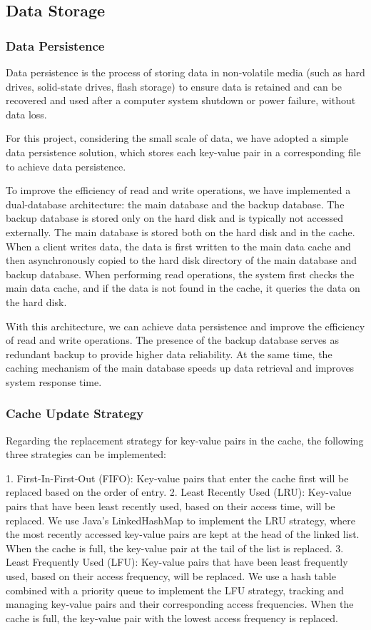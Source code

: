 \documentclass[sigconf]{acmart}
\begin{document}
\subsection{Data Storage}

\subsubsection{Data Persistence}

Data persistence is the process of storing data in non-volatile media (such as hard drives, solid-state drives, flash storage) to ensure data is retained and can be recovered and used after a computer system shutdown or power failure, without data loss.

For this project, considering the small scale of data, we have adopted a simple data persistence solution, which stores each key-value pair in a corresponding file to achieve data persistence.

To improve the efficiency of read and write operations, we have implemented a dual-database architecture: the main database and the backup database. The backup database is stored only on the hard disk and is typically not accessed externally. The main database is stored both on the hard disk and in the cache. When a client writes data, the data is first written to the main data cache and then asynchronously copied to the hard disk directory of the main database and backup database. When performing read operations, the system first checks the main data cache, and if the data is not found in the cache, it queries the data on the hard disk.

With this architecture, we can achieve data persistence and improve the efficiency of read and write operations. The presence of the backup database serves as redundant backup to provide higher data reliability. At the same time, the caching mechanism of the main database speeds up data retrieval and improves system response time.

\subsubsection{Cache Update Strategy}

Regarding the replacement strategy for key-value pairs in the cache, the following three strategies can be implemented:

1. First-In-First-Out (FIFO): Key-value pairs that enter the cache first will be replaced based on the order of entry.
2. Least Recently Used (LRU): Key-value pairs that have been least recently used, based on their access time, will be replaced. We use Java's LinkedHashMap to implement the LRU strategy, where the most recently accessed key-value pairs are kept at the head of the linked list. When the cache is full, the key-value pair at the tail of the list is replaced.
3. Least Frequently Used (LFU): Key-value pairs that have been least frequently used, based on their access frequency, will be replaced. We use a hash table combined with a priority queue to implement the LFU strategy, tracking and managing key-value pairs and their corresponding access frequencies. When the cache is full, the key-value pair with the lowest access frequency is replaced.
\end{document}

